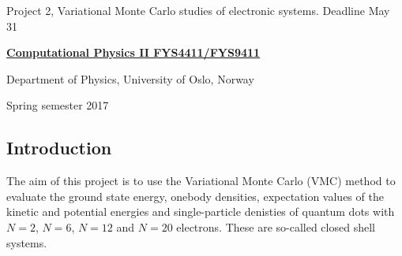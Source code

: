 \documentclass[%
oneside,                 %
final,                   %
10pt]{article}
\begin{document}

\newcommand{\exercisesection}[1]{\subsection*{#1}}






\thispagestyle{empty}

\begin{center}
{\LARGE\bf
\begin{spacing}{1.25}
Project 2, Variational Monte Carlo studies of electronic systems. Deadline May 31  
\end{spacing}
}
\end{center}


\begin{center}
{\bf \href{{http://www.uio.no/studier/emner/matnat/fys/FYS4411/index-eng.html}}{Computational Physics II FYS4411/FYS9411}}
\end{center}

    \begin{center}
\centerline{{\small Department of Physics, University of Oslo, Norway}}
\end{center}
    

\begin{center}
Spring semester 2017
\end{center}

\vspace{1cm}


\subsection{Introduction}

The aim of this project is to use the Variational Monte
Carlo (VMC) method to evaluate 
the ground state energy, onebody densities, expectation values of the kinetic and potential energies 
 and single-particle denisties of 
quantum dots with $N=2$, $N=6$, $N=12$ and $N=20$ electrons. These are so-called closed shell systems.
\end{document}
